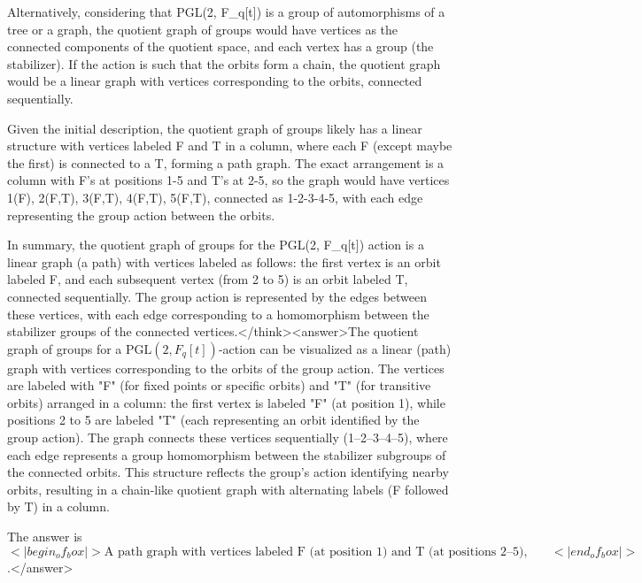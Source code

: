 Alternatively, considering that PGL(2, F_q[t]) is a group of automorphisms of a tree or a graph, the quotient graph of groups would have vertices as the connected components of the quotient space, and each vertex has a group (the stabilizer). If the action is such that the orbits form a chain, the quotient graph would be a linear graph with vertices corresponding to the orbits, connected sequentially. 

Given the initial description, the quotient graph of groups likely has a linear structure with vertices labeled F and T in a column, where each F (except maybe the first) is connected to a T, forming a path graph. The exact arrangement is a column with F's at positions 1-5 and T's at 2-5, so the graph would have vertices 1(F), 2(F,T), 3(F,T), 4(F,T), 5(F,T), connected as 1-2-3-4-5, with each edge representing the group action between the orbits. 

In summary, the quotient graph of groups for the PGL(2, F_q[t]) action is a linear graph (a path) with vertices labeled as follows: the first vertex is an orbit labeled F, and each subsequent vertex (from 2 to 5) is an orbit labeled T, connected sequentially. The group action is represented by the edges between these vertices, with each edge corresponding to a homomorphism between the stabilizer groups of the connected vertices.</think><answer>The quotient graph of groups for a \( \text{PGL}(2, F_q[t]) \)-action can be visualized as a linear (path) graph with vertices corresponding to the orbits of the group action. The vertices are labeled with "F" (for fixed points or specific orbits) and "T" (for transitive orbits) arranged in a column: the first vertex is labeled "F" (at position 1), while positions 2 to 5 are labeled "T" (each representing an orbit identified by the group action). The graph connects these vertices sequentially (1–2–3–4–5), where each edge represents a group homomorphism between the stabilizer subgroups of the connected orbits. This structure reflects the group's action identifying nearby orbits, resulting in a chain-like quotient graph with alternating labels (F followed by T) in a column.  

The answer is \(<|begin_of_box|>\text{A path graph with vertices labeled F (at position 1) and T (at positions 2–5), connected sequentially}<|end_of_box|>\).</answer>